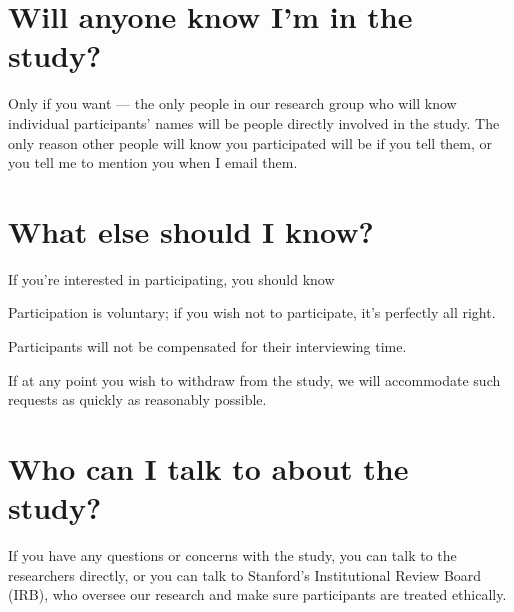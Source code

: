\documentclass[10pt]{article}
\begin{document}
\section*{Will anyone know I'm in the study?}
Only if you want ---
the only people in our research group who will know individual participants' names
will be people directly involved in the study.
The only reason other people will know you participated will be if
you tell them, or you tell me
to mention you when I email them.

\section*{What else should I know?}
If you're interested in participating, you should know
\begin{compactitem}
  \item Participation is voluntary; if you wish not to participate, it's perfectly all right.
  \item Participants will not be compensated for their interviewing time.
  \item If at any point you wish to withdraw from the study,
        we will accommodate such requests as quickly as reasonably possible.
\end{compactitem}

\section*{Who can I talk to about the study?}
If you have any questions or concerns with the study,
you can talk to the researchers directly, or
you can talk to Stanford's Institutional Review Board (IRB),
who oversee our research and make sure participants are treated ethically.
\end{document}
